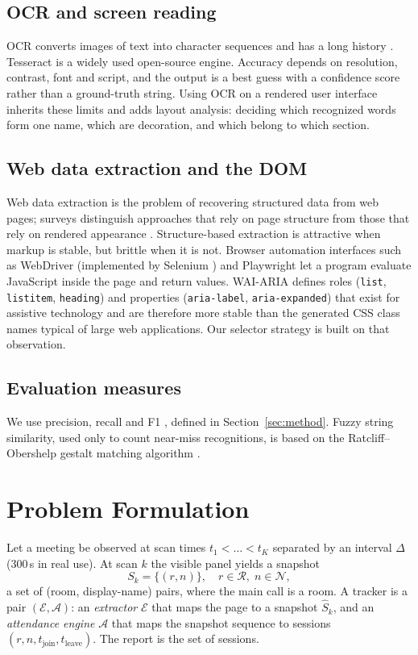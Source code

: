 \documentclass[conference]{IEEEtran}
\begin{document}
\subsection{OCR and screen reading}
OCR converts images of text into character sequences and has a long history \cite{mori1992historical}. Tesseract \cite{smith2007tesseract} is a widely used open-source engine. Accuracy depends on resolution, contrast, font and script, and the output is a best guess with a confidence score rather than a ground-truth string. Using OCR on a rendered user interface inherits these limits and adds layout analysis: deciding which recognized words form one name, which are decoration, and which belong to which section.

\subsection{Web data extraction and the DOM}
Web data extraction is the problem of recovering structured data from web pages; surveys distinguish approaches that rely on page structure from those that rely on rendered appearance \cite{ferrara2014web}. Structure-based extraction is attractive when markup is stable, but brittle when it is not. Browser automation interfaces such as WebDriver \cite{w3c2018webdriver} (implemented by Selenium \cite{selenium}) and Playwright \cite{playwright} let a program evaluate JavaScript inside the page and return values. WAI-ARIA \cite{w3c2023aria} defines roles (\texttt{list}, \texttt{listitem}, \texttt{heading}) and properties (\texttt{aria-label}, \texttt{aria-expanded}) that exist for assistive technology and are therefore more stable than the generated CSS class names typical of large web applications. Our selector strategy is built on that observation.

\subsection{Evaluation measures}
We use precision, recall and F1 \cite{manning2008ir,powers2011evaluation}, defined in Section~\ref{sec:method}. Fuzzy string similarity, used only to count near-miss recognitions, is based on the Ratcliff--Obershelp gestalt matching algorithm \cite{ratcliff1988gestalt}.

\section{Problem Formulation}\label{sec:problem}
Let a meeting be observed at scan times $t_1<\dots<t_K$ separated by an interval $\Delta$ (300\,s in real use). At scan $k$ the visible panel yields a snapshot
\begin{equation}
S_k=\{(r,n)\}, \quad r\in\mathcal{R},\; n\in\mathcal{N},
\end{equation}
a set of (room, display-name) pairs, where the main call is a room. A tracker is a pair $(\mathcal{E},\mathcal{A})$: an \emph{extractor} $\mathcal{E}$ that maps the page to a snapshot $\hat S_k$, and an \emph{attendance engine} $\mathcal{A}$ that maps the snapshot sequence to sessions $(r,n,t_{\text{join}},t_{\text{leave}})$. The report is the set of sessions.
\end{document}

